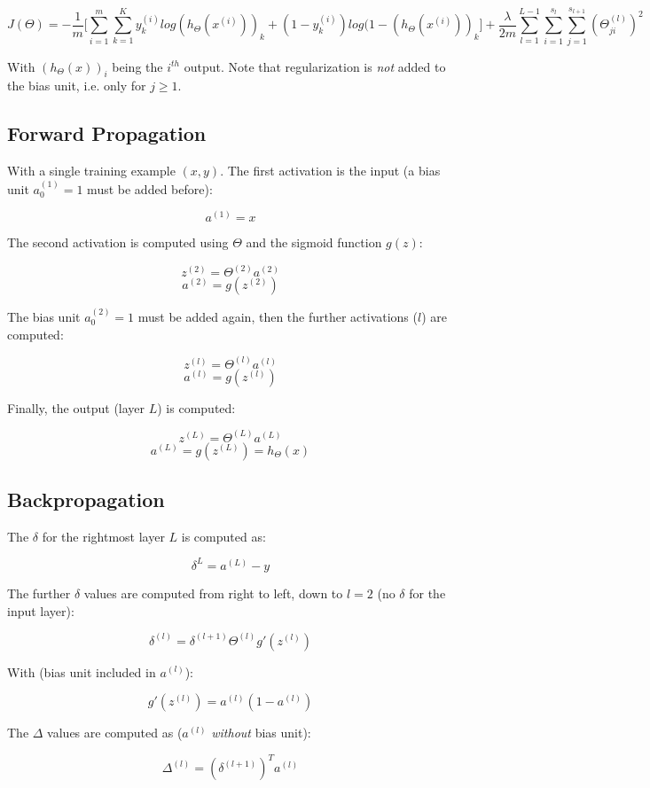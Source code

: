 \documentclass[a4paper,11pt]{scrartcl}
\begin{document}
$$ J(\Theta) = -\frac{1}{m} \Bigg[ \sum^{m}_{i=1} \sum^{K}_{k=1} y^{(i)}_k log(h_{\Theta}(x^{(i)}))_{k} + (1-y^{(i)}_k) log(1-(h_{\Theta}(x^{(i)}))_k  \Bigg] + \frac{\lambda}{2m} \sum^{L-1}_{l=1} \sum^{s_l}_{i=1} \sum^{s_{l+1}}_{j=1} (\Theta^{(l)}_{ji})^2 $$

With $(h_{\Theta}(x))_i$ being the $i^{th}$ output. Note that regularization is \textit{not} added to the bias unit, i.e. only for $j \geq 1$.

\subsection{Forward Propagation}

With a single training example $(x,y)$. The first activation is the input (a bias unit $a^{(1)}_0=1$ must be added before):

$$ a^{(1)} = x $$

The second activation is computed using $\Theta$ and the sigmoid function $g(z)$:

$$ z^{(2)} = \Theta^{(2)} a^{(2)} $$
$$ a^{(2)} = g(z^{(2)}) $$

The bias unit $a^{(2)}_0=1$ must be added again, then the further activations ($l$) are computed:

$$ z^{(l)} = \Theta^{(l)} a^{(l)} $$
$$ a^{(l)} = g(z^{(l)}) $$

Finally, the output (layer $L$) is computed:

$$ z^{(L)} = \Theta^{(L)} a^{(L)} $$
$$ a^{(L)} = g(z^{(L)}) = h_{\Theta}(x)$$

\subsection{Backpropagation}

The $\delta$ for the rightmost layer $L$ is computed as:

$$ \delta^{L} = a^{(L)} - y $$

The further $\delta$ values are computed from right to left, down to $l=2$ (no $\delta$ for the input layer):

$$ \delta^{(l)} = \delta^{(l+1)} \Theta^{(l)} g'(z^{(l)}) $$

With (bias unit included in $a^{(l)}$):

$$ g'(z^{(l)}) = a^{(l)} (1 - a^{(l)}) $$

The $\Delta$ values are computed as ($a^{(l)}$ \textit{without} bias unit):

$$ \Delta^{(l)} = (\delta^{(l+1)})^{T} a^{(l)} $$
\end{document}
